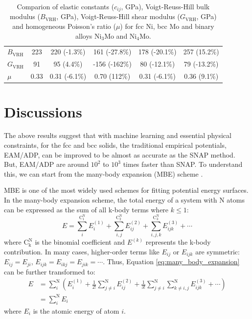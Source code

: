 \documentclass[prb,reprint]{revtex4-2}
\begin{document}
\begin{table}
\begin{tabular}{lccccc}
$B_{\mathrm{VRH}}$ & 223  & 220 (-1.3\%)     & 161 (-27.8\%)   & 178 (-20.1\%) & 257 (15.2\%)  \\
$G_{\mathrm{VRH}}$ & 91   & 95 (4.4\%)       & -156 (-162\%)   & 80 (-12.1\%)  & 79 (-13.2\%)  \\
$\mu$              & 0.33 & 0.31 (-6.1\%)    & 0.70 (112\%)    & 0.31 (-6.1\%) & 0.36 (9.1\%)  \\
\hline
\end{tabular}
\caption{\label{table:NiMo_elastic_constants}
Comparion of elastic constants ($c_{ij}$, GPa), Voigt-Reuss-Hill bulk modulus 
($B_{\mathrm{VRH}}$, GPa), Voigt-Reuss-Hill shear modulus ($G_{\mathrm{VRH}}$, 
GPa) and homogeneous Poisson's ratio ($\mu$) for fcc Ni, bcc Mo and binary 
alloys Ni$_{3}$Mo and Ni$_{4}$Mo.
}
\end{table}

% 
%
\section{Discussions}
\label{sec:discussions}

The above results suggest that with machine learning and essential physical 
constraints, for the fcc and bcc solids, the traditional empirical potentials, 
EAM/ADP, can be improved to be almost as accurate as the SNAP method. But, 
EAM/ADP are around $10^2$ to $10^3$ times faster than SNAP. To understand this,
we can start from the many-body expansion (MBE) scheme \cite{kCON}.

MBE is one of the most widely used schemes for fitting potential energy 
surfaces. In the many-body expansion scheme, the total energy of a system with N 
atoms can be expressed as the sum of all k-body terms where $k \le 1$:
\begin{equation}
\label{eq:many_body_expansion}
E = 
\sum_{i}^{\mathrm{C^N_1}}{E^{(1)}_{i}} +
\sum_{i,j}^{\mathrm{C^N_2}}{E^{(2)}_{ij}} + 
\sum_{i,j,k}^{\mathrm{C^N_3}}{E^{(3)}_{ijk}} + \cdots 
\end{equation}
where $\mathrm{C^N_k}$ is the binomial coefficient and $E^{(k)}$ represents the 
k-body contribution. In many cases, higher-order terms like $E_{ij}$ or 
$E_{ijk}$ are symmetric: $E_{ij}=E_{ji}$, $E_{ijk}=E_{ikj}=E_{jik}=\cdots$. 
Thus, Equation \ref{eq:many_body_expansion} can be further transformed to:
\begin{align}
\label{eq:MBE_atomic}
E & = \sum_{i}^{\mathrm{N}}{\left(
    E^{(1)}_{i} + 
    \frac{1}{2!}\sum_{j \ne i}^{\mathrm{N}}{E^{(2)}_{ij}} +
    \frac{1}{3!}\sum_{j \ne i}^{\mathrm{N}}{
        \sum_{k \ne i,j}^{\mathrm{N}}{E^{(3)}_{ijk}}
    } +
    \cdots
\right)} \nonumber \\
& = \sum_{i}^{\mathrm{N}}{E_{i}}
\end{align}
where $E_{i}$ is the atomic energy of atom $i$. 
\end{document}
